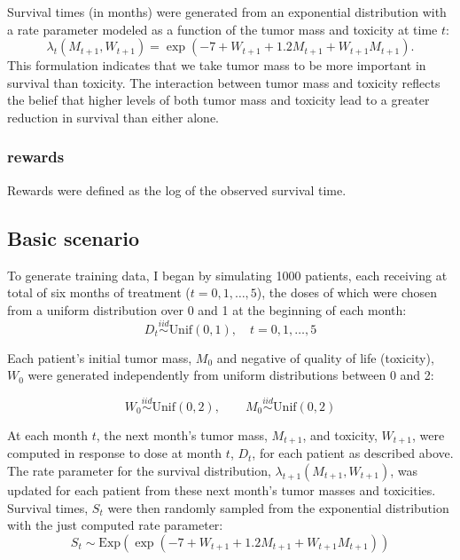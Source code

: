 \documentclass[12pt]{article}
\begin{document}
Survival times (in months) were generated from an exponential distribution with a rate parameter modeled as a function of the tumor mass and toxicity at time $t$:
\begin{equation}
  \lambda_{t}(M_{t+1}, W_{t+1}) = \exp(-7 + W_{t+1} + 1.2 M_{t+1} + W_{t+1} M_{t+1}).
\end{equation}
This formulation indicates that we take tumor mass to be more important in survival than toxicity. The interaction between tumor mass and toxicity reflects the belief that higher levels of both tumor mass and toxicity lead to a greater reduction in survival than either alone.




\subsubsection{rewards} %
\label{sub:}

Rewards were defined as the log of the observed survival time.


\subsection{Basic scenario} %
\label{sub:basic_setup}

To generate training data, I began by simulating 1000 patients, each receiving at total of six months of treatment ($t = 0, 1, \ldots, 5$), the doses of which were chosen from a uniform distribution over 0 and 1 at the beginning of each month:
\begin{equation}
  D_{t} \overset{iid}{\sim} \text{Unif}(0, 1), \quad t = 0, 1, \ldots, 5
\end{equation}

Each patient's initial tumor mass, $M_{0}$ and negative of quality of life (toxicity), $W_{0}$ were generated independently from uniform distributions between 0 and 2:

\begin{equation}
  W_{0} \overset{iid}{\sim} \text{Unif}(0, 2), \qquad
  M_{0} \overset{iid}{\sim} \text{Unif}(0, 2)
\end{equation}

At each month $t$, the next month's tumor mass, $M_{t + 1}$, and toxicity, $W_{t + 1}$, were computed in response to dose at month $t$, $D_{t}$, for each patient as described above. The rate parameter for the survival distribution, $\lambda_{t+1}(M_{t + 1}, W_{t + 1})$, was updated for each patient from these next month's tumor masses and toxicities. Survival times, $S_{t}$ were then randomly sampled from the exponential distribution with the just computed rate parameter:
\begin{equation}
  S_{t} \sim \text{Exp}(\exp(-7 + W_{t+1} + 1.2 M_{t+1} + W_{t+1} M_{t+1}))
\end{equation}
\end{document}
